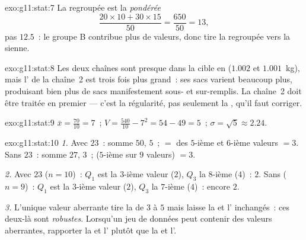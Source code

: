 \begin{solution}{exo:g11:stat:7}
La  regroupée est la  \emph{pondérée}
\[
\frac{20 \times 10 + 30 \times 15}{50} = \frac{650}{50} = 13,
\]
pas $12.5$~: le groupe B contribue plus de valeurs, donc tire la 
regroupée vers la sienne.
\end{solution}

\begin{solution}{exo:g11:stat:8}
Les deux chaînes sont presque dans la cible en  ($1.002$ et
$1.001$~kg), mais l' de la chaîne~2 est trois fois plus grand~:
ses sacs varient beaucoup plus, produisant bien plus de sacs
manifestement sous- et sur-remplis. La chaîne~2 doit être traitée en
premier --- c'est la régularité, pas seulement la , qu'il faut
corriger.
\end{solution}

\begin{solution}{exo:g11:stat:9}
$\bar x = \frac{70}{10} = 7$~;
$V = \frac{540}{10} - 7^2 = 54 - 49 = 5$~;
$\sigma = \sqrt5 \approx 2.24$.
\end{solution}

\begin{solution}{exo:g11:stat:10}
\emph{1.} Avec $23$~: somme $50$,  $5$~;  $=$  des
$5$-ième et $6$-ième valeurs $= 3$. Sans $23$~: somme $27$, 
$3$~;  ($5$-ième sur $9$ valeurs) $= 3$.

\emph{2.} Avec $23$ ($n = 10$)~: $Q_1$ est la $3$-ième valeur ($2$),
$Q_3$ la $8$-ième ($4$)~:  $2$. Sans ($n = 9$)~:
$Q_1$ est la $3$-ième valeur ($2$), $Q_3$ la $7$-ième ($4$)~: encore
$2$.

\emph{3.} L'unique valeur aberrante tire la  de $3$ à $5$ mais
laisse la  et l' inchangés~: ces deux-là sont
\emph{robustes}. Lorsqu'un jeu de données peut contenir des valeurs
aberrantes, rapporter la  et l' plutôt que la
 et l'.
\end{solution}

